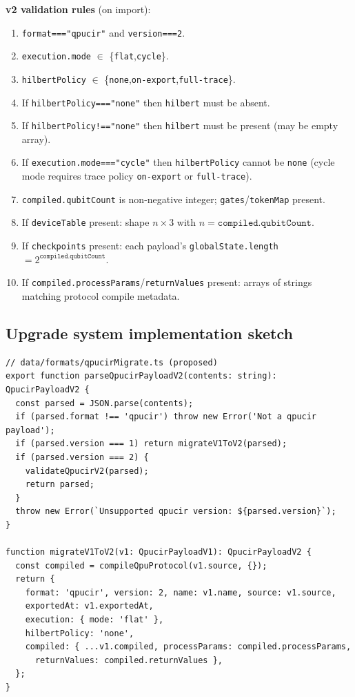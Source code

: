 \documentclass[11pt,a4paper]{article}
\begin{document}
\textbf{v2 validation rules} (on import):
\begin{enumerate}
  \item \texttt{format==="qpucir"} and \texttt{version===2}.
  \item \texttt{execution.mode} $\in$ \{\texttt{flat},\texttt{cycle}\}.
  \item \texttt{hilbertPolicy} $\in$ \{\texttt{none},\texttt{on-export},\texttt{full-trace}\}.
  \item If \texttt{hilbertPolicy==="none"} then \texttt{hilbert} must be absent.
  \item If \texttt{hilbertPolicy!=="none"} then \texttt{hilbert} must be present (may be empty array).
  \item If \texttt{execution.mode==="cycle"} then \texttt{hilbertPolicy} cannot be \texttt{none} (cycle mode requires trace policy \texttt{on-export} or \texttt{full-trace}).
  \item \texttt{compiled.qubitCount} is non-negative integer; \texttt{gates}/\texttt{tokenMap} present.
  \item If \texttt{deviceTable} present: shape $n\times 3$ with $n=\texttt{compiled.qubitCount}$.
  \item If \texttt{checkpoints} present: each payload's \texttt{globalState.length} $= 2^{\texttt{compiled.qubitCount}}$.
  \item If \texttt{compiled.processParams}/\texttt{returnValues} present: arrays of strings matching protocol compile metadata.
\end{enumerate}

\subsection{Upgrade system implementation sketch}

\begin{lstlisting}[style=code]
// data/formats/qpucirMigrate.ts (proposed)
export function parseQpucirPayloadV2(contents: string): QpucirPayloadV2 {
  const parsed = JSON.parse(contents);
  if (parsed.format !== 'qpucir') throw new Error('Not a qpucir payload');
  if (parsed.version === 1) return migrateV1ToV2(parsed);
  if (parsed.version === 2) {
    validateQpucirV2(parsed);
    return parsed;
  }
  throw new Error(`Unsupported qpucir version: ${parsed.version}`);
}

function migrateV1ToV2(v1: QpucirPayloadV1): QpucirPayloadV2 {
  const compiled = compileQpuProtocol(v1.source, {});
  return {
    format: 'qpucir', version: 2, name: v1.name, source: v1.source,
    exportedAt: v1.exportedAt,
    execution: { mode: 'flat' },
    hilbertPolicy: 'none',
    compiled: { ...v1.compiled, processParams: compiled.processParams,
      returnValues: compiled.returnValues },
  };
}
\end{lstlisting}
\end{document}
